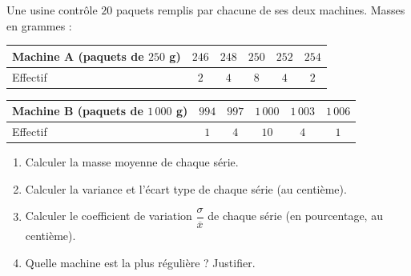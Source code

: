 
\newcommand{\R}{\mathbb{R}}
\newcommand{\vect}[1]{\overrightarrow{#1}}

Une usine contrôle $20$ paquets remplis par chacune de ses deux machines. Masses en grammes :
\begin{center}
\begin{tabular}{|l|c|c|c|c|c|}\hline
Machine A (paquets de $250$ g) & $246$ & $248$ & $250$ & $252$ & $254$ \\\hline
Effectif & $2$ & $4$ & $8$ & $4$ & $2$ \\\hline
\end{tabular}
\end{center}

\begin{center}
\begin{tabular}{|l|c|c|c|c|c|}\hline
Machine B (paquets de $1\,000$ g) & $994$ & $997$ & $1\,000$ & $1\,003$ & $1\,006$ \\\hline
Effectif & $1$ & $4$ & $10$ & $4$ & $1$ \\\hline
\end{tabular}
\end{center}
\begin{enumerate}
  \item Calculer la masse moyenne de chaque série.
  \item Calculer la variance et l'écart type de chaque série (au centième).
  \item Calculer le coefficient de variation $\dfrac{\sigma}{\overline x}$ de chaque série (en pourcentage, au centième).
  \item Quelle machine est la plus régulière ? Justifier.
\end{enumerate}

